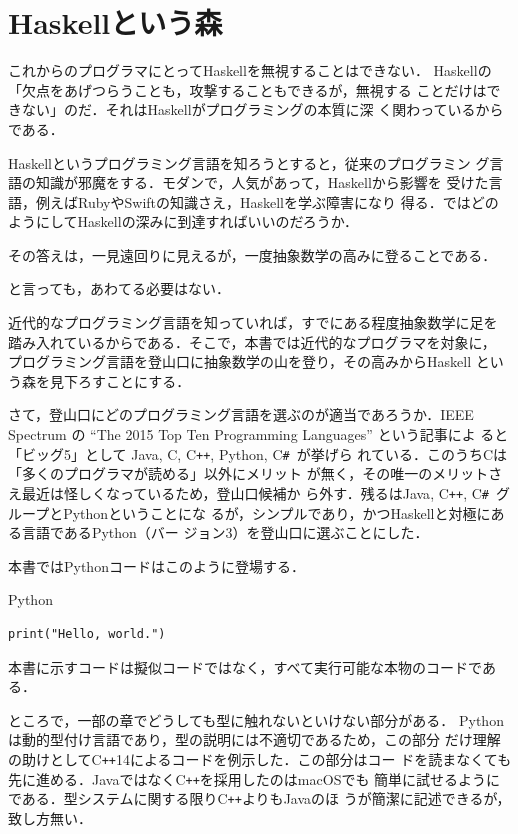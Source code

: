 \documentclass[a5paper,twoside,fleqn,draft]{jsbook}
\newcommand{\programminglanguage}[1]{\textsf{#1}}
\newcommand{\clang}{\programminglanguage{C}}
\newcommand{\csharp}{\programminglanguage{C}\texttt{\#}}
\newcommand{\cxx}{\programminglanguage{C}\texttt{++}}
\newcommand{\cxxfourteen}{\cxx\programminglanguage{14}}
\newcommand{\haskell}{\programminglanguage{Haskell}}
\newcommand{\java}{\programminglanguage{Java}}
\newcommand{\python}{\programminglanguage{Python}}
\newcommand{\ruby}{\programminglanguage{Ruby}}
\newcommand{\swift}{\programminglanguage{Swift}}
\newenvironment{pythoncode}{\begin{itembox}[r]{\python}}{\end{itembox}}
\begin{document}
\section{\haskell という森}

これからのプログラマにとって\haskell を無視することはできない．
\haskell の「欠点をあげつらうことも，攻撃することもできるが，無視する
  ことだけはできない」のだ．それは\haskell がプログラミングの本質に深
く関わっているからである．

\haskell というプログラミング言語を知ろうとすると，従来のプログラミン
グ言語の知識が邪魔をする．モダンで，人気があって，\haskell から影響を
受けた言語，例えば\ruby や\swift の知識さえ，\haskell を学ぶ障害になり
得る．ではどのようにして\haskell の深みに到達すればいいのだろうか．

その答えは，一見遠回りに見えるが，一度抽象数学の高みに登ることである．

と言っても，あわてる必要はない．

近代的なプログラミング言語を知っていれば，すでにある程度抽象数学に足を
踏み入れているからである．そこで，本書では近代的なプログラマを対象に，
プログラミング言語を登山口に抽象数学の山を登り，その高みから\haskell
という森を見下ろすことにする．


さて，登山口にどのプログラミング言語を選ぶのが適当であろうか．IEEE
Spectrum の ``The 2015 Top Ten Programming Languages'' という記事によ
ると「ビッグ5」として \java, \clang, \cxx, \python, \csharp\ が挙げら
れている．このうち\clang は「多くのプログラマが読める」以外にメリット
が無く，その唯一のメリットさえ最近は怪しくなっているため，登山口候補か
ら外す．残るは\java, \cxx, \csharp\ グループと\python ということにな
るが，シンプルであり，かつ\haskell と対極にある言語である\python（バー
  ジョン3）を登山口に選ぶことにした．

本書では\python コードはこのように登場する．
\begin{pythoncode}
\begin{verbatim}
print("Hello, world.")
\end{verbatim}
\end{pythoncode}
本書に示すコードは擬似コードではなく，すべて実行可能な本物のコードであ
る．

ところで，一部の章でどうしても型に触れないといけない部分がある．
\python は動的型付け言語であり，型の説明には不適切であるため，この部分
だけ理解の助けとして\cxxfourteen によるコードを例示した．この部分はコー
ドを読まなくても先に進める．\java ではなく\cxx を採用したのはmacOSでも
簡単に試せるようにである．型システムに関する限り\cxx よりも\java のほ
うが簡潔に記述できるが，致し方無い．
\end{document}
